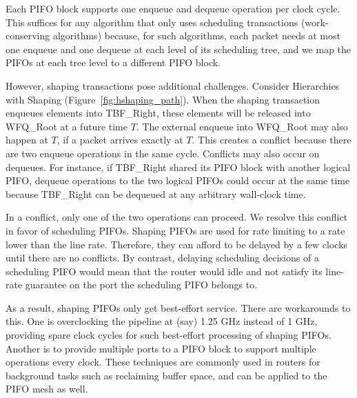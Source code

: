 Each PIFO block supports one enqueue and dequeue operation per clock cycle.
This suffices for any algorithm that only uses scheduling transactions
(work-conserving algorithms) because, for such algorithms, each packet needs at
most one enqueue and one dequeue at each level of its scheduling tree, and we
map the PIFOs at each tree level to a different PIFO block.

However, shaping transactions pose additional challenges. Consider Hierarchies
with Shaping (Figure~\ref{fig:hshaping_path}). When the shaping transaction
enqueues elements into TBF\_Right, these elements will be released into
WFQ\_Root at a future time $T$. The external enqueue into WFQ\_Root may also
happen at $T$, if a packet arrives exactly at $T$. This creates a conflict
because there are two enqueue operations in the same cycle.  Conflicts may also
occur on dequeues.  For instance, if TBF\_Right shared its PIFO block with
another logical PIFO, dequeue operations to the two logical PIFOs could occur
at the same time because TBF\_Right can be dequeued at any arbitrary wall-clock
time.


In a conflict, only one of the two operations can proceed. We resolve this
conflict in favor of scheduling PIFOs. Shaping PIFOs are used for rate limiting
to a rate lower than the line rate. Therefore, they can afford to be delayed by
a few clocks until there are no conflicts. By contrast, delaying scheduling
decisions of a scheduling PIFO would mean that the router would idle and not
satisfy its line-rate guarantee on the port the scheduling PIFO belongs to.

As a result, shaping PIFOs only get best-effort service. There are workarounds
to this. One is overclocking the pipeline at (say) 1.25 GHz instead of 1 GHz,
providing spare clock cycles for such best-effort processing of shaping PIFOs.
Another is to provide multiple ports to a PIFO block to support multiple
operations every clock.  These techniques are commonly used in routers for
background tasks such as reclaiming buffer space, and can be applied to the
PIFO mesh as well.
